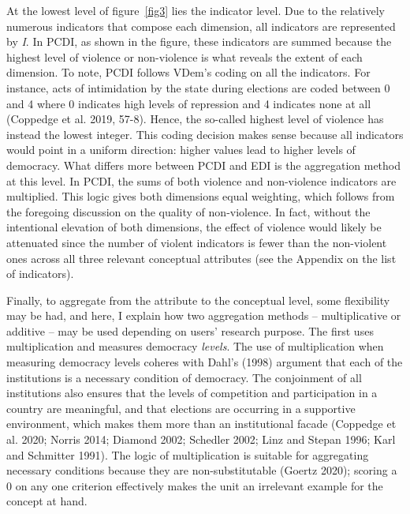 \documentclass [11pt]{article}
\begin{document}
At the lowest level of figure~\ref{fig3} lies the indicator level. Due to the relatively numerous indicators that compose each dimension, all indicators are represented by \emph{I}. In PCDI, as shown in the figure, these indicators are summed because the highest level of violence or non-violence is what reveals the extent of each dimension. To note, PCDI follows VDem's coding on all the indicators. For instance, acts of intimidation by the state during elections are coded between 0 and 4 where 0 indicates high levels of repression and 4 indicates none at all (Coppedge et al. 2019, 57-8). Hence, the so-called highest level of violence has instead the lowest integer. This coding decision makes sense because all indicators would point in a uniform direction: higher values lead to higher levels of democracy. What differs more between PCDI and EDI is the aggregation method at this level. In PCDI, the sums of both violence and non-violence indicators are multiplied. This logic gives both dimensions equal weighting, which follows from the foregoing discussion on the quality of non-violence. In fact, without the intentional elevation of both dimensions, the effect of violence would likely be attenuated since the number of violent indicators is fewer than the non-violent ones across all three relevant conceptual attributes (see the Appendix on the list of indicators).

Finally, to aggregate from the attribute to the conceptual level, some flexibility may be had, and here, I explain how two aggregation methods -- multiplicative or additive -- may be used depending on users' research purpose. The first uses multiplication and measures democracy \emph{levels}. The use of multiplication when measuring democracy levels coheres with Dahl's (1998) argument that each of the institutions is a necessary condition of democracy. The conjoinment of all institutions also ensures that the levels of competition and participation in a country are meaningful, and that elections are occurring in a supportive environment, which makes them more than an institutional facade (Coppedge et al. 2020; Norris 2014; Diamond 2002; Schedler 2002; Linz and Stepan 1996; Karl and Schmitter 1991). The logic of multiplication is suitable for aggregating necessary conditions because they are non-substitutable (Goertz 2020); scoring a 0 on any one criterion effectively makes the unit an irrelevant example for the concept at hand.
\end{document}
